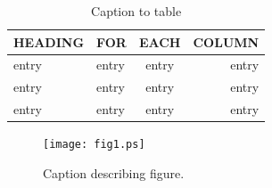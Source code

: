 \documentclass[preprint]{iucr}              %
\begin{document}



\begin{table}
\caption{Caption to table}
\begin{tabular}{llcr}      %
 HEADING    & FOR        & EACH       & COLUMN     \\
\hline
 entry      & entry      & entry      & entry      \\
 entry      & entry      & entry      & entry      \\
 entry      & entry      & entry      & entry      \\
\end{tabular}
\end{table}


\begin{figure}
\caption{Caption describing figure.}
\texttt{[image: fig1.ps]}
\end{figure}



\end{document}
